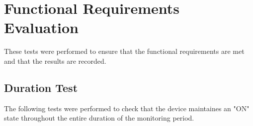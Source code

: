 \documentclass[12pt, titlepage]{article}
\begin{document}
\listoffigures %

\newpage


\section{Functional Requirements Evaluation}
These tests were performed to ensure that the functional requirements are met and that the results are recorded.
\subsection{Duration Test}

The following tests were performed to check that the device maintaines an "ON" state throughout the entire duration of the monitoring period.
\end{document}
